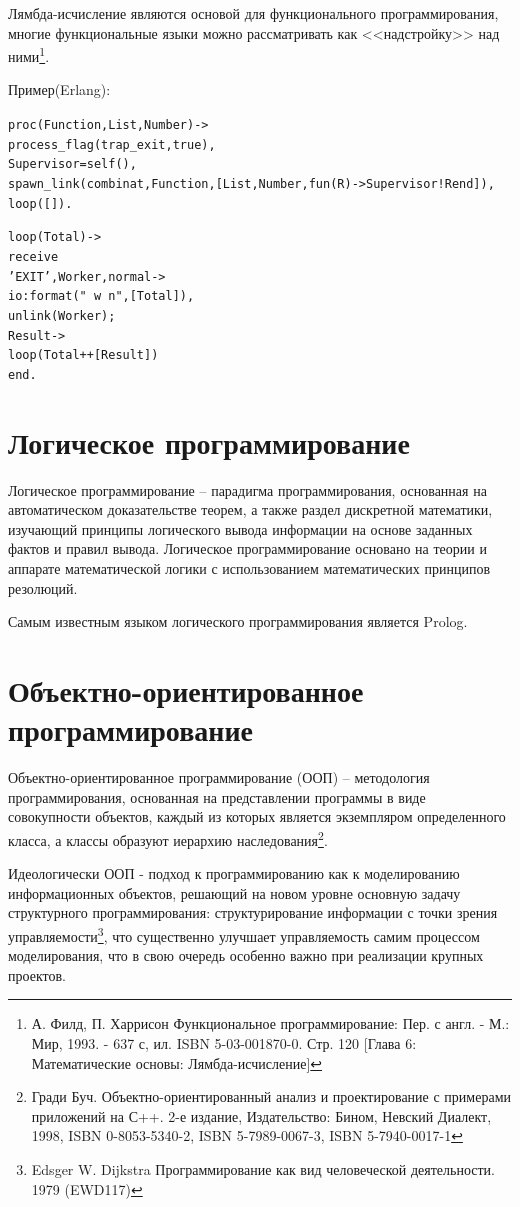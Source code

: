 \documentclass[12pt, twoside]{report}
\begin{document}
Лямбда-исчисление являются основой для функционального программирования, многие функциональные языки можно рассматривать как <<надстройку>> над ними\footnote{А. Филд, П. Харрисон Функциональное программирование: Пер. с англ. - М.: Мир, 1993. - 637 с, ил. ISBN 5-03-001870-0. Стр. 120 [Глава 6: Математические основы: Лямбда-исчисление]}.

Пример(Erlang):
\begin{alltt}
proc(Function, List, Number) ->
    process_flag(trap_exit, true),
    Supervisor = self(),
    spawn_link(combinat, Function, [List, Number, fun(R)->Supervisor!R end]),
    loop([]).

loop(Total) ->
    receive
    {'EXIT', Worker, normal} ->
        io:format("~w~n", [Total]),
        unlink(Worker);
    Result ->
        loop(Total ++ [Result])
    end.
\end{alltt}
\section*{Логическое программирование}
	
Логическое программирование -- парадигма программирования, основанная на автоматическом доказательстве теорем, а также раздел дискретной математики, изучающий принципы логического вывода информации на основе заданных фактов и правил вывода. Логическое программирование основано на теории и аппарате математической логики с использованием математических принципов резолюций.

Самым известным языком логического программирования является Prolog.

\section*{Объектно-ориентированное программирование}

Объектно-ориентированное программирование (ООП) -- методология программирования, основанная на представлении программы в виде совокупности объектов, каждый из которых является экземпляром определенного класса, а классы образуют иерархию наследования\footnote{Гради Буч. Объектно-ориентированный анализ и проектирование с примерами приложений на С++. 2-е издание, Издательство: Бином, Невский Диалект, 1998, ISBN 0-8053-5340-2, ISBN 5-7989-0067-3, ISBN 5-7940-0017-1}.

Идеологически ООП - подход к программированию как к моделированию информационных объектов, решающий на новом уровне основную задачу структурного программирования: структурирование информации с точки зрения управляемости\footnote{Edsger W. Dijkstra Программирование как вид человеческой деятельности. 1979 (EWD117)}, что существенно улучшает управляемость самим процессом моделирования, что в свою очередь особенно важно при реализации крупных проектов.
\end{document}
